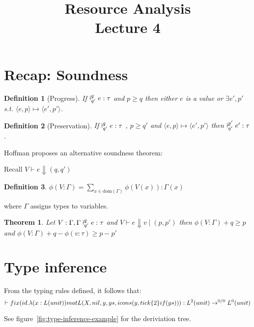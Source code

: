 \documentclass{article}
\title{Resource Analysis \\ \Large{Lecture 4}}
\newtheorem{theorem}{Theorem}[section]
\newtheorem{definition}{Definition}[theorem]
\newcommand{\ldash}[2]{\vdash^{\hspace{-.4em}#1}_{\hspace{-.4em}#2}}
\begin{document}
\maketitle
\section{Recap: Soundness}

\begin{definition}[Progress]
If $\ldash{q}{q'} e : \tau $ and $p \geq q$ then either $e$ is a value or $\exists e',p'$ s.t. $\langle e,p \rangle \mapsto \langle e',p'\rangle$.
\end{definition}

\begin{definition}[Preservation]
If $\ldash{q}{q'} e : \tau$ , $p \geq q'$ and   $\langle e,p \rangle \mapsto \langle e',p'\rangle$ then $\ldash{p'}{q'} e': \tau$.
\end{definition}

Hoffman proposes an alternative soundness theorem:

Recall $V \vdash e \Downarrow (q,q')$
\begin{definition}
$\phi(V : \Gamma) = \sum_{x \in \text{dom}(\Gamma)} \phi(V(x)) : \Gamma(x) $
\end{definition}
where $\Gamma $ assigns types to variables.

\begin{theorem}
Let $V : \Gamma, \Gamma \ldash{q}{q'} e : \tau$ and $V \vdash e \Downarrow v \mid (p,p')$ then $\phi(V:\Gamma) + q \geq p$ and $\phi (V : \Gamma) +  q - \phi (v : \tau) \geq p - p'$
\end{theorem}


\section{Type inference}

From the typing rules defined, it follows that:
\[\ldash{}{} fix(id . \lambda(x : L(unit)) 
    matL(X,nil,y,ys,icons(y,tick\{2\} if (ys))) : L^2(unit) \rightarrow^{0/0} L^0(unit)\]

See figure~\ref{fig:type-inference-example} for the deriviation tree.
\end{document}
